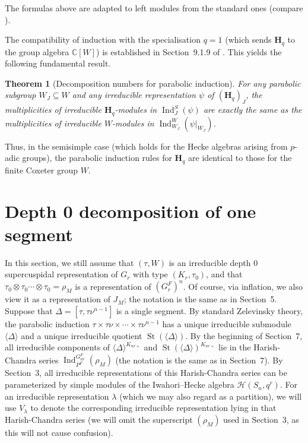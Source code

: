 \documentclass[12pt]{article}
\newtheorem{theorem}{Theorem}[section]
\theoremstyle{remark}
\begin{document}
The formulas above are adapted to left modules from the standard ones (compare \cite[page~287]{GeckPfeiffer2000}).

The compatibility of induction with the specialisation $q=1$ (which sends $\mathbf{H}_q$ to the group algebra $\mathbb{C}[W]$) is established in Section~9.1.9 of \cite{GeckPfeiffer2000}.  
This yields the following fundamental result.

\begin{theorem}[Decomposition numbers for parabolic induction]
\label{thm:induction_decomposition}
For any parabolic subgroup $W_J\subseteq W$ and any irreducible representation $\psi$ of $(\mathbf{H}_q)_J$, the multiplicities of irreducible $\mathbf{H}_q$-modules in $\operatorname{Ind}_J^S(\psi)$ are exactly the same as the multiplicities of irreducible $W$-modules in $\operatorname{Ind}_{W_J}^W(\psi|_{W_J})$.
\end{theorem}

Thus, in the semisimple case (which holds for the Hecke algebras arising from $p$-adic groups), the parabolic induction rules for $\mathbf{H}_q$ are identical to those for the finite Coxeter group $W$.

\section{Depth 0 decomposition of one segment}

In this section, we still assume that $(\tau,W)$ is an irreducible depth $0$ supercuspidal representation of $G_r$ with type $(K_r,\tau_0)$, and that $\tau_0 \otimes \tau_0 \cdots \otimes \tau_0 = \rho_M$ is a representation of $(G_r^F)^n$. Of course, via inflation, we also view it as a representation of $J_M$; the notation is the same as in Section~5. Suppose that $\Delta = [\tau,\tau\nu^{n-1}]$ is a single segment. By standard Zelevinsky theory, the parabolic induction $\tau \times \tau\nu \times \cdots \times \tau\nu^{n-1}$ has a unique irreducible submodule $\langle\Delta\rangle$ and a unique irreducible quotient $\operatorname{St}(\langle\Delta\rangle)$. By the beginning of Section~7, all irreducible components of $\langle\Delta\rangle^{K_{nr+}}$ and $\operatorname{St}(\langle\Delta\rangle)^{K_{nr+}}$ lie in the Harish-Chandra series $\operatorname{Ind}_{P^F}^{G_{nr}^F}(\rho_M)$ (the notation is the same as in Section~7). By Section~3, all irreducible representations of this Harish-Chandra series can be parameterized by simple modules of the Iwahori--Hecke algebra $\mathcal{H}(S_n,q^r)$. For an irreducible representation $\lambda$ (which we may also regard as a partition), we will use $V_{\lambda}$ to denote the corresponding irreducible representation lying in that Harish-Chandra series (we will omit the superscript $(\rho_M)$ used in Section~3, as this will not cause confusion).
\end{document}
